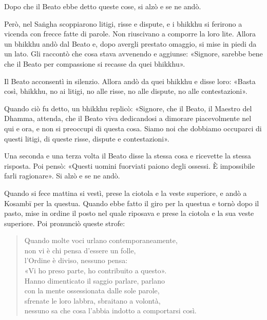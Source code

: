 Dopo che il Beato ebbe detto queste cose, si alzò e se ne andò.




 Però, nel Saṅgha scoppiarono litigi, risse e dispute, e i
bhikkhu si ferirono a vicenda con frecce fatte di parole. Non riuscivano
a comporre la loro lite. Allora un bhikkhu andò dal Beato e, dopo
avergli prestato omaggio, si mise in piedi da un lato. Gli raccontò che
cosa stava avvenendo e aggiunse: «Signore, sarebbe bene che il Beato per
compassione si recasse da quei bhikkhu».


Il Beato acconsentì in silenzio. Allora andò da quei bhikkhu e disse
loro: «Basta così, bhikkhu, no ai litigi, no alle risse, no alle
dispute, no alle contestazioni».


Quando ciò fu detto, un bhikkhu replicò: «Signore, che il Beato, il
Maestro del Dhamma, attenda, che il Beato viva dedicandosi a dimorare
piacevolmente nel qui e ora, e non si preoccupi di questa cosa. Siamo
noi che dobbiamo occuparci di questi litigi, di queste risse, dispute e
contestazioni».


Una seconda e una terza volta il Beato disse la stessa cosa e ricevette
la stessa risposta. Poi pensò: «Questi uomini fuorviati paiono degli
ossessi. È impossibile farli ragionare». Si alzò e se ne andò.


Quando si fece mattina si vestì, prese la ciotola e la veste superiore,
e andò a Kosambī per la questua. Quando ebbe fatto il giro per la
questua e tornò dopo il pasto, mise in ordine il posto nel quale
riposava e prese la ciotola e la sua veste superiore. Poi pronunciò
queste strofe:




\begin{quote}
Quando molte voci urlano contemporaneamente, \\
non vi è chi pensa d’essere un folle, \\
l’Ordine è diviso, nessuno pensa: \\
«Vi ho preso parte, ho contribuito a questo». \\
Hanno dimenticato il saggio parlare, parlano \\
con la mente ossessionata dalle sole parole, \\
sfrenate le loro labbra, sbraitano a volontà, \\
nessuno sa che cosa l’abbia indotto a comportarsi così.
\end{quote}

